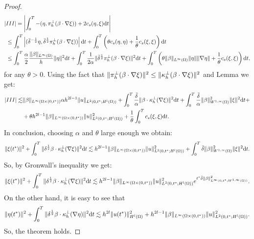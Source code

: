 \begin{proof}
\begin{align*}
&|III| = \left| \displaystyle\int_0^T -(\eta, \pi_{h}^\perp(\beta\cdot \nabla \xi)) + 2c_s(\eta,\xi) {\rm d}t  \right| \\
& \ \leq    \displaystyle\int_0^T \left|  ( \bar \delta^{-\frac{1}{2}}\eta, \bar \delta^{\frac{1}{2}}\pi_{h}^\perp(\beta\cdot \nabla \xi)) \right| {\rm d}t + \displaystyle\int_0^T \left(\theta c_s(\eta,\eta)+\frac{1}{\theta}c_s(\xi,\xi)\right) {\rm d}t\\
& \  \leq \displaystyle\int_0^T \frac{\alpha}{2} \frac{\|\beta\|_{L^\infty(\Omega)}}{h} \|\eta\|^2 {\rm d}t + \displaystyle\int_0^T \frac{1}{2\alpha} \| \bar \delta^{\frac{1}{2}} \pi_{h}^\perp(\beta \cdot \nabla \xi)\|^2 {\rm d}t +\displaystyle\int_0^T \left(\theta \|\beta\|_{L^\infty(\Omega)}\|\eta\|\|\nabla \eta\| + \frac{1}{\theta}c_s(\xi,\xi)\right) {\rm d}t,
\end{align*}
for any $\theta > 0$. Using the fact that  $\|\pi_{h}^\perp(\beta \cdot \nabla \xi)\|^2 \leq \|\kappa_h^\perp(\beta \cdot \nabla \xi)\|^2$ and Lemma  we get:
\begin{align*}
|III| \lesssim & %
\|\beta\|_{L^\infty(\Qq)} \alpha h^{2l-1} \|u\|_{L^2(0,t^*;H^l(\Omega))} 
+ \tint{\frac{\bar \delta}{\alpha} \| \bb \cdot \szpp (\nabla  \xi) \|^2 }
+ \tint{ \frac{\bar \delta}{\alpha}  {\|\bb\|_{W^{1,\infty}(\Omega)}^2}  \|\xi\|^2} + \\\
& + \theta h^{2l-1} \|\bb\|_{L^\infty(\Qq)}  \|u\|^2_{L^2(0,t^*;H^l(\Omega))} + \frac{1}{\theta} \tint{c_s(\xi,\xi)}  .
\end{align*}
In conclusion, choosing $\alpha$ and $\theta$ large enough we obtain:
\begin{align*}
\|\xi(t^*)\|^2 + \displaystyle\int_0^T \| \delta^\frac{1}{2} \beta \cdot \kappa_h^\perp (\nabla \xi) \|^2  {\rm d}t  \lesssim  h^{2l-1}\|\beta\|_{L^\infty(\Omega \times (0,t^*))} \|u\|_{L^2(0,t^*;H^l(\Omega))}^2 +  \displaystyle\int_0^T  \bar \delta \|\beta\|_{W^{1,\infty}(\Omega)}^2 \|\xi\|^2 {\rm d}t.
\end{align*}
So, by Gronwall's inequality we get:
\begin{align*}
\|\xi(t^*)\|^2 + \displaystyle\int_0^T \| \delta^\frac{1}{2} \beta \cdot \kappa_h^\perp (\nabla \xi) \|^2  {\rm d}t \lesssim  h^{2l-1}\|\beta\|_{L^\infty(\Omega \times (0,t^*))} \|u\|_{L^2(0,t^*;H^l(\Omega))}^2 e^{t^* {\bar \delta } \|\beta  \|^2_{L^\infty(0,t^*;W^{1,\infty}(\Omega))}}.
\end{align*}
On the other hand, it is easy to see that 
\begin{align*}
\|\eta(t^*)\|^2 + \displaystyle\int_0^T \| \delta^\frac{1}{2} \beta \cdot \kappa_h^\perp (\nabla \eta) \|^2  {\rm d}t \lesssim h^{2l} \|u(t^*)\|_{H^l(\Omega)}^2 + h^{2l-1}\|\beta\|_{L^\infty(\Omega \times (0,t^*))} \|u\|^2_{L^2(0,t^*;H^l(\Omega))}.
\end{align*}
So, the theorem holds.
\end{proof}

